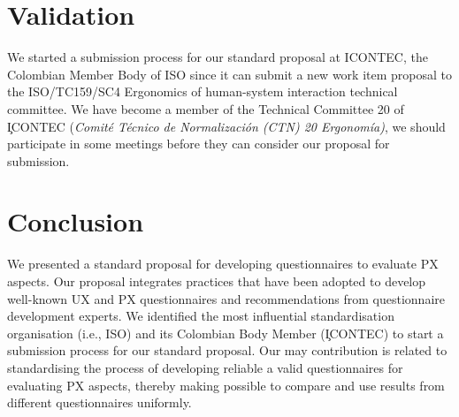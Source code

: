 \section{Validation} %
We started a submission process for our standard proposal at \ac{ICONTEC}, the Colombian Member Body of \ac{ISO} since it can submit a new work item proposal to the ISO/TC159/SC4 Ergonomics of human-system interaction technical committee. We have become a member of the Technical Committee 20 of \c{ICONTEC} (\textit{Comit\'e T\'ecnico de Normalizaci\'on (CTN) 20 Ergonom\'ia)}, we should participate in some meetings before they can consider our proposal for submission.


\section{Conclusion} %
\label{sec:conclusion_2}
We presented a standard proposal for developing questionnaires to evaluate \ac{PX} aspects. Our proposal integrates practices that have been adopted to develop well-known \ac{UX} and \ac{PX} questionnaires and recommendations from questionnaire development experts. We identified the most influential standardisation organisation (i.e., \ac{ISO}) and its Colombian Body Member (\c{ICONTEC}) to start a submission process for our standard proposal. Our may contribution is related to standardising the process of developing reliable a valid questionnaires for evaluating \ac{PX} aspects, thereby making possible to compare and use results from different questionnaires uniformly.
